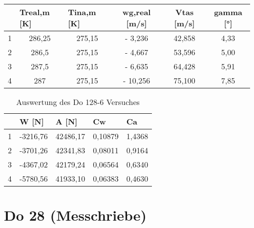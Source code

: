 \begin{table}[h]
	\centering
	\begin{tabular}{|c|c|c|c|c|c|}
		\hline
		& \multicolumn{1}{l|}{\textbf{Treal,m {[}K{]}}} & \multicolumn{1}{l|}{\textbf{Tina,m {[}K{]}}} & \textbf{wg,real {[}m/s{]}} & \textbf{Vtas {[}m/s{]}} & \textbf{gamma {[}°{]}} \\ \hline
		1 & 286,25                                        & 275,15                                       & - 3,236                     & 42,858                  & 4,33                   \\ \hline
		2 & 286,5                                         & 275,15                                       & - 4,667                    & 53,596                  & 5,00                   \\ \hline
		3 & 287,5                                         & 275,15                                       & - 6,635                    & 64,428                  & 5,91                   \\ \hline
		4 & 287                                           & 275,15                                       & - 10,256                   & 75,100                  & 7,85                   \\ \hline
	\end{tabular}
\end{table}

\begin{table}[h]
	\centering
	\begin{tabular}{|l|l|l|l|l|}
		\hline
		& \textbf{W {[}N{]}} & \textbf{A {[}N{]}} & \textbf{Cw} & \textbf{Ca} \\ \hline
		1 & -3216,76           & 42486,17           & 0,10879     & 1,4368      \\ \hline
		2 & -3701,26           & 42341,83           & 0,08011     & 0,9164      \\ \hline
		3 & -4367,02           & 42179,24           & 0,06564     & 0,6340      \\ \hline
		4 & -5780,56           & 41933,10           & 0,06383     & 0,4630      \\ \hline
	\end{tabular}
	\caption{Auswertung des Do 128-6 Versuches}
\end{table}








\vspace{1cm}
\section{Do 28 (Messchriebe)}

\newpage